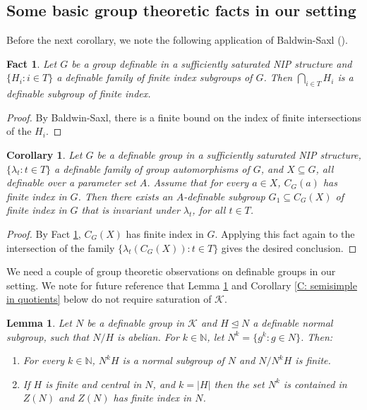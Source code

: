 \documentclass[11pt]{amsart}
\newtheorem{corollary}[theorem]{Corollary}
\newtheorem{fact}[theorem]{Fact}
\newtheorem{lemma}[theorem]{Lemma}
\theoremstyle{definition}
\newcommand{\CK}{{\mathcal K}}
\newcommand{\0}{\emptyset}
\def\sub{\subseteq}
\begin{document}
\subsection{Some basic group theoretic facts in our setting} 

Before the next corollary, we note the following application of Baldwin-Saxl (\cite[Lemma 1.3]{PoiGroups}).
\begin{fact}\label{F: Baldwin saxl}
    Let $G$ be a group definable in a sufficiently saturated NIP structure and $\{H_i:i\in T\}$ a definable family of finite index subgroups of $G$. Then $\bigcap_{i\in T} H_i$ is a definable subgroup of finite index.
\end{fact}
\begin{proof}
    By Baldwin-Saxl, there is a finite bound on the index of finite intersections of the $H_i$.
\end{proof}

\begin{corollary}\label{Baldwin Saxl} 
    Let $G$ be a definable group in a sufficiently saturated NIP structure,  $\{\lambda_t:t\in T\}$ a definable family of group automorphisms of $G$, and $X\sub G$, all definable over a parameter set $A$. Assume that  for every $a\in X$, $C_G(a)$ has finite index in $G$. Then there exists an $A$-definable subgroup $G_1\sub C_G(X)$ of finite index in $G$ that is invariant under $\lambda_t$, for all $t\in T$.
\end{corollary}
\begin{proof}
    By Fact \ref{F: Baldwin saxl},  $C_G(X)$ has finite index in $G$. Applying this fact again to the intersection of the family $\{\lambda_t(C_G(X)):t\in T\}$ gives the desired conclusion.
\end{proof}

We need a couple of group theoretic observations on definable groups in our setting. We note for future reference  that Lemma \ref{L:groups 1} and Corollary \ref{C: semisimple in quotients} below do not require saturation of $\CK$.  
\begin{lemma}\label{L:groups 1}
Let $N$ be a definable group in $\CK$ and $H\trianglelefteq N$ a definable normal subgroup, such that $N/H$ is abelian. 
For $k\in \mathbb N$, let $N^k=\{g^k:g\in N\}$. Then: 
\begin{enumerate}
    \item For every $k\in \mathbb N$, $N^k H$ is a normal subgroup of $N$ and $N/N^kH$ is finite.
    
    \item If $H$ is finite and central in $N$,  and $k=|H|$ then the set $N^k$ is contained in  $Z(N)$ and $Z(N)$ has finite index in $N$.
    
\end{enumerate}
\end{lemma}
\end{document}
